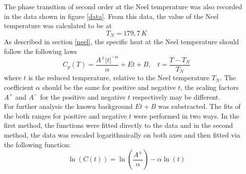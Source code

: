 \documentclass{include/thesisclass3}
\newcommand{\e}[1]{\,\si{#1}}
\begin{document}
The phase transition of second order at the Neel temperature was also recorded in the data shown in figure \ref{data}.
From this data, the value of the Neel temperature was calculated to be at
\[T_N = 179,7\e{K}\]
As described in section \ref{neel}, the specific heat at the Neel temperature should follow the following laws
\begin{equation}
\label{fitfunc}
 C_p(T) = \frac{ A^\pm |t|^{-\alpha}}{\alpha} + Et + B, ~~~~ t = \frac{T-T_N}{T_N}
\end{equation}
where $t$ is the reduced temperature, relative to the Neel temperature $T_N$. The coefficient $\alpha$ should be the same for positive and negative $t$, the scaling factors $A^+$ and $A^-$ for the positive and negative $t$ respectively may be different.\\
For further analysis the known background $E t + B$ was substracted. 
The fits of the both ranges for positive and negative $t$ were performed in two ways. In the first method, the functions were fitted directly to the data and in the second method, the data was rescaled logarithmically on both axes and then fitted via the following function:
\[ \ln(C(t)) = \ln \left( \frac{A^\pm}{\alpha}\right) - \alpha \ln (t) \]
\end{document}
